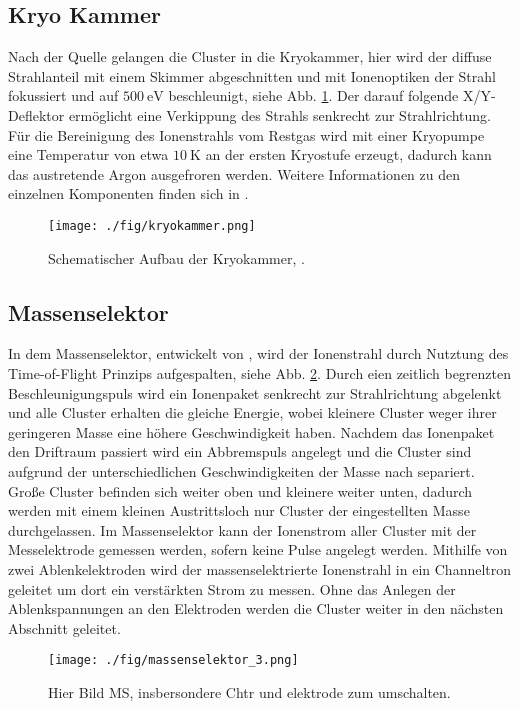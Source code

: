 \subsection{Kryo Kammer}
Nach der Quelle gelangen die Cluster in die Kryokammer, hier wird der diffuse Strahlanteil mit einem Skimmer abgeschnitten und mit Ionenoptiken der Strahl fokussiert und auf $\SI{500}{\eV}$ beschleunigt, siehe Abb. \ref{fig:kryokammer}.
Der darauf folgende X/Y-Deflektor ermöglicht eine Verkippung des Strahls senkrecht zur Strahlrichtung.
Für die Bereinigung des Ionenstrahls vom Restgas wird mit einer Kryopumpe eine Temperatur von etwa $\SI{10}{\kelvin}$ \cite[S. 27]{woltermaster} an der ersten Kryostufe erzeugt, dadurch kann das austretende Argon ausgefroren werden.
Weitere Informationen zu den einzelnen Komponenten finden sich in \cite{krause}.
\begin{figure}
    \centering
    \texttt{[image: ./fig/kryokammer.png]}
    \caption{Schematischer Aufbau der Kryokammer, \cite{woltermaster}.}
    \label{fig:kryokammer}
\end{figure}

\subsection{Massenselektor}
In dem Massenselektor, entwickelt von \cite{Issendorff.1999}, wird der Ionenstrahl durch Nutztung des Time-of-Flight Prinzips aufgespalten, siehe Abb. \ref{fig:mschtr}.
Durch eien zeitlich begrenzten Beschleunigungspuls wird ein Ionenpaket senkrecht zur Strahlrichtung abgelenkt und alle Cluster erhalten die gleiche Energie, wobei kleinere Cluster weger ihrer geringeren Masse eine höhere Geschwindigkeit haben.
Nachdem das Ionenpaket den Driftraum passiert wird ein Abbremspuls angelegt und die Cluster sind aufgrund der unterschiedlichen Geschwindigkeiten der Masse nach separiert.
Große Cluster befinden sich weiter oben und kleinere weiter unten, dadurch werden mit einem kleinen Austrittsloch nur Cluster der eingestellten Masse durchgelassen.
Im Massenselektor kann der Ionenstrom aller Cluster mit der Messelektrode gemessen werden, sofern keine Pulse angelegt werden.
Mithilfe von zwei Ablenkelektroden wird der massenselektrierte Ionenstrahl in ein Channeltron geleitet um dort ein verstärkten Strom zu messen.
Ohne das Anlegen der Ablenkspannungen an den Elektroden werden die Cluster weiter in den nächsten Abschnitt geleitet.

\begin{figure}
    \centering
    \texttt{[image: ./fig/massenselektor\_3.png]}
    \caption{Hier Bild MS, insbersondere Chtr und elektrode zum umschalten.}
    \label{fig:mschtr}
\end{figure}

